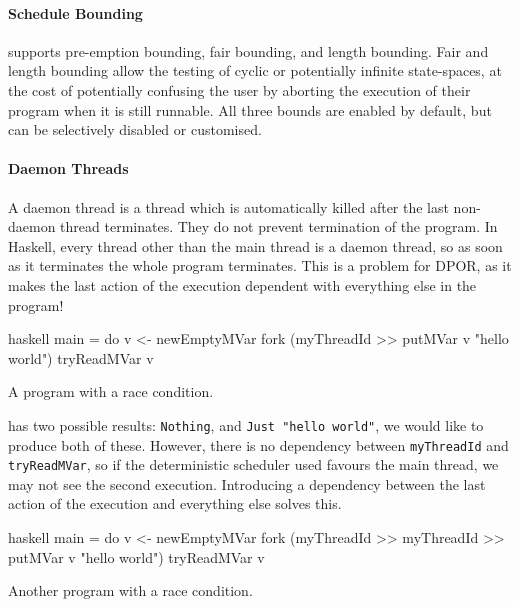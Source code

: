 \paragraph{Schedule Bounding}
\dejafu{} supports pre-emption bounding\cite{musuvathi2007}, fair
bounding\cite{musuvathi2008}, and length bounding.  Fair and length
bounding allow the testing of cyclic or potentially infinite
state-spaces, at the cost of potentially confusing the user by
aborting the execution of their program when it is still runnable.
All three bounds are enabled by default, but can be selectively
disabled or customised.

\paragraph{Daemon Threads}
A daemon thread is a thread which is automatically killed after the
last non-daemon thread terminates.  They do not prevent termination of
the program.  In Haskell, every thread other than the main thread is a
daemon thread, so as soon as it terminates the whole program
terminates.  This is a problem for DPOR, as it makes the last action
of the execution dependent with everything else in the program!

\begin{listing}
\centering
\begin{cminted}{haskell}
main = do
  v <- newEmptyMVar
  fork (myThreadId >> putMVar v "hello world")
  tryReadMVar v
\end{cminted}
\caption{A program with a race condition.}\label{lst:daemon1}
\end{listing}

 has two possible results: \verb|Nothing|, and
\verb|Just "hello world"|, we would like \dejafu{} to produce both of
these.  However, there is no dependency between \verb|myThreadId| and
\verb|tryReadMVar|, so if the deterministic scheduler used favours the
main thread, we may not see the second execution.  Introducing a
dependency between the last action of the execution and everything
else solves this.

\begin{listing}
\centering
\begin{cminted}{haskell}
main = do
  v <- newEmptyMVar
  fork (myThreadId >> myThreadId >> putMVar v "hello world")
  tryReadMVar v
\end{cminted}
\caption{Another program with a race condition.}\label{lst:daemon2}
\end{listing}

